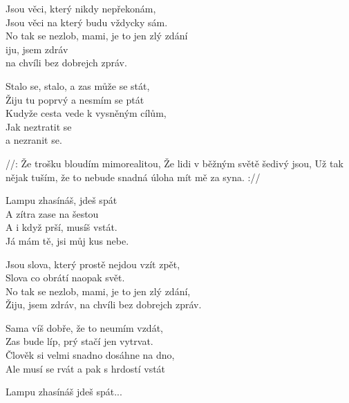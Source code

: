
\ve{}
Jsou věci, který nikdy nepřekonám,\\ 
Jsou věci na který budu vždycky sám.\\
No tak se nezlob, mami, je to jen zlý zdání\\ 
iju, jsem zdráv \\
na chvíli bez dobrejch zpráv. 

\ve{}
Stalo se, stalo, a zas může se stát,\\
Žiju tu poprvý a nesmím se ptát\\
Kudyže cesta vede k vysněným cílům,\\
Jak neztratit se\\
a nezranit se. 

\cho{}
//: Že trošku bloudím mimorealitou, 
Že lidi v běžným světě šedivý jsou, 
Už tak nějak tuším, že to nebude snadná úloha 
mít mě za syna.  ://

Lampu zhasínáš, jdeš spát\\
A zítra zase na šestou\\
A i když prší, musíš vstát.\\
Já mám tě, jsi můj kus nebe.  

\ve{}
Jsou slova, který prostě nejdou vzít zpět,\\
Slova co obrátí naopak svět.\\
No tak se nezlob, mami, je to jen zlý zdání,\\
Žiju, jsem zdráv, na chvíli bez dobrejch zpráv.

Sama víš dobře, že to neumím vzdát,\\
Zas bude líp, prý stačí jen vytrvat.\\
Člověk si velmi snadno dosáhne na dno,\\
Ale musí se rvát a pak s hrdostí vstát 

\cho{}
\re{+} Lampu zhasínáš jdeš spát...

\esong